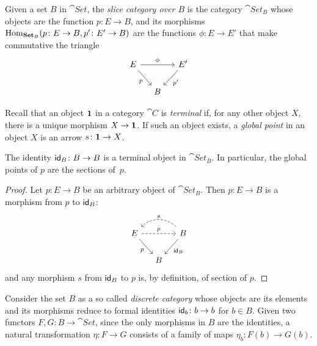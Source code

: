 \begin{defn}
    Given a set $B$ in $\cat{Set}$, the \textsl{slice category over $B$} is the category $\cat{Set}_B$ whose objects are the function $p\colon E\to B$, and its morphisms $\Hom_{\cat{Set}_B}(p\colon E\to B,p'\colon E'\to B)$ are the functions $\phi\colon E\to E'$ that make commutative the triangle
    \begin{equation}\label{tik:slice-morphism}
        \begin{tikzcd}[column sep=small]
            E
                    \arrow[rd,"p"']
                    \arrow[rr,"\phi"]
                &&E'
                    \arrow[ld,"p'"]\\
                &B
        \end{tikzcd}
    \end{equation}
\end{defn}

\begin{rem}
    Recall that an object $\textrm{\boldmath$1$}$ in a category $\cat{C}$ is \textsl{terminal} if, for any other object $X$, there is a unique morphism $X\to\textrm{\boldmath$1$}$. If such an object exists, a \textsl{global point} in an object $X$ is an arrow $s\colon\mbf1\to X$.
\end{rem}

\begin{prop}
    The identity\/ $\id_B\colon B\to B$ is a terminal object in\/ $\cat{Set}_B$. In particular, the global points of\/ $p$ are the sections of\/~$p$.
\end{prop}

\begin{proof}
    Let $p\colon E\to B$ be an arbitrary object of $\cat{Set}_B$. Then $p\colon E\to B$ is a morphism from $p$ to $\mathsf{id}_B$:
    \[
        \begin{tikzcd}[column sep=small]
            E
                    \arrow[rd,"p"']
                    \arrow[rr,"p",dashed]
                &&B
                    \arrow[ll,bend right=45,"s"',dashed]
                    \arrow[ld,"\id_B"]\\
                &B
        \end{tikzcd}
    \]
    and any morphism $s$ from $\mathsf{id}_B$ to $p$ is, by definition, of section of $p$.
\end{proof}

\begin{rem}
    Consider the set $B$ as a so called \textsl{discrete category} whose objects are its elements and its morphisms reduce to formal identities $\id_b\colon b\to b$ for $b\in B$. Given two functors $F,G\colon B\to\cat{Set}$, since the only morphisms in $B$ are the identities, a natural transformation $\eta\colon F\to G$ consists of a family of maps $\eta_b\colon F(b)\to G(b)$.
\end{rem}

